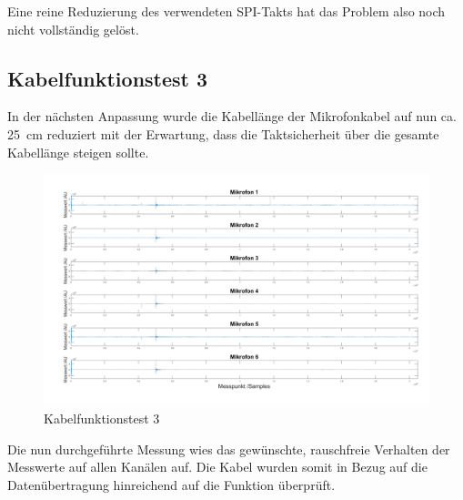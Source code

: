 Eine reine Reduzierung des verwendeten SPI-Takts hat das Problem also noch nicht vollständig gelöst.

\subsection{Kabelfunktionstest 3}

In der nächsten Anpassung wurde die Kabellänge der Mikrofonkabel auf nun ca. \SI{25}{cm} reduziert mit der Erwartung, dass die Taktsicherheit über die gesamte Kabellänge steigen sollte.

\begin{figure}[h]
	\begin{center}
		\includegraphics[scale=0.1]{Sections/Tests/Test_3_d}
	\end{center}
	\caption{Kabelfunktionstest 3}
	\label{fig:Test_3_d}
\end{figure}

Die nun durchgeführte Messung wies das gewünschte, rauschfreie Verhalten der Messwerte auf allen Kanälen auf. Die Kabel wurden somit in Bezug auf die Datenübertragung hinreichend auf die Funktion überprüft. 


\newpage